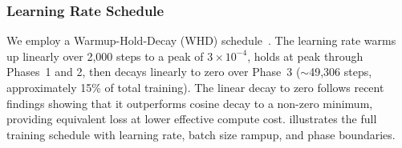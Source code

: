 \documentclass[11pt,a4paper]{article}
\begin{document}
\subsubsection{Learning Rate Schedule}

We employ a Warmup-Hold-Decay (WHD) schedule~\cite{hu2024minicpm,hagele2024scaling}.
The learning rate warms up linearly over 2{,}000 steps to a peak of $3 \times 10^{-4}$,
holds at peak through Phases~1 and 2, then decays linearly to zero over
Phase~3 (${\sim}$49{,}306 steps, approximately 15\% of total training). The
linear decay to zero follows recent findings showing that it outperforms cosine
decay to a non-zero minimum, providing equivalent loss at lower effective
compute cost.  illustrates the full training schedule
with learning rate, batch size rampup, and phase boundaries.
\end{document}
